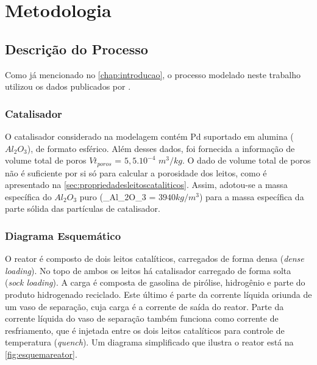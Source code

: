 %
\chapter{Metodologia}
\label{chap:metodologia}

\section{Descrição do Processo} \label{sec:descricaoprocesso}

Como já mencionado no \autoref{chap:introducao}, o processo modelado
neste trabalho utilizou os dados publicados por . 

\subsection{Catalisador} \label{sec:catalisador}

O catalisador considerado na modelagem contém Pd suportado em alumina ($Al_2O_3$), de formato esférico. Além desses dados, foi fornecida a informação de volume total de poros $Vt_{poros}$ = $5,5.10^{-4}$ $m^3/kg$. O dado de volume total de poros não é suficiente por si só para calcular a porosidade dos leitos, como é apresentado na \autoref{sec:propriedadesleitoscataliticos}. Assim, adotou-se a massa específica do $Al_2O_3$ puro (\rho_{Al_2O_3} = $3940 kg/m^3$) para a massa específica da parte sólida das partículas de catalisador.


\subsection{Diagrama Esquemático} \label{sec:diagramaesquematico}

O reator é composto de dois leitos catalíticos, carregados de forma densa
(\emph{dense loading}). No topo de ambos os leitos há catalisador carregado de
forma solta (\emph{sock loading}). A carga é composta de gasolina de pirólise,
hidrogênio e parte do produto hidrogenado reciclado. Este último é parte da
corrente líquida oriunda de um vaso de separação, cuja carga é a corrente de
saída do reator. Parte da corrente líquida do vaso de separação também
funciona como corrente de resfriamento, que é injetada entre os dois leitos
catalíticos para controle de temperatura (\emph{quench}). Um diagrama simplificado que ilustra o
reator está na \autoref{fig:esquemareator}. 

